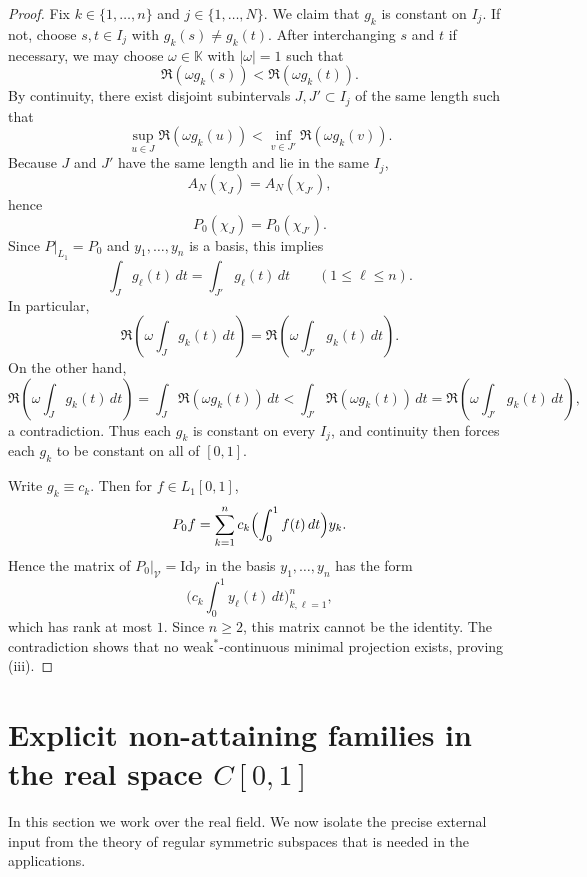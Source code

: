 \documentclass[11pt]{amsart}
\numberwithin{equation}{section}
\theoremstyle{definition}
\theoremstyle{remark}
\newcommand{\K}{\mathbb K}
\newcommand{\Id}{\mathrm{Id}}
\begin{document}
\begin{proof}
Fix $k\in\{1,\dots,n\}$ and $j\in\{1,\dots,N\}$. We claim that $g_k$ is constant on $I_j$. If not, choose $s,t\in I_j$ with $g_k(s)\neq g_k(t)$. After interchanging $s$ and $t$ if necessary, we may choose $\omega\in\K$ with $|\omega|=1$ such that
\[
\Re(\omega g_k(s)) < \Re(\omega g_k(t)).
\]
By continuity, there exist disjoint subintervals $J,J'\subset I_j$ of the same length such that
\[
\sup_{u\in J} \Re(\omega g_k(u)) < \inf_{v\in J'} \Re(\omega g_k(v)).
\]
Because $J$ and $J'$ have the same length and lie in the same $I_j$,
\[
A_N(\chi_J)=A_N(\chi_{J'}),
\]
hence
\[
P_0(\chi_J)=P_0(\chi_{J'}).
\]
Since $P|_{L_1}=P_0$ and $y_1,\dots,y_n$ is a basis, this implies
\[
\int_J g_\ell(t)\,dt = \int_{J'} g_\ell(t)\,dt
\qquad (1\leqslant \ell\leqslant n).
\]
In particular,
\[
\Re\left(\omega\int_J g_k(t)\,dt\right)
=
\Re\left(\omega\int_{J'} g_k(t)\,dt\right).
\]
On the other hand,
\[
\Re\left(\omega\int_J g_k(t)\,dt\right)
=
\int_J \Re(\omega g_k(t))\,dt
<
\int_{J'} \Re(\omega g_k(t))\,dt
=
\Re\left(\omega\int_{J'} g_k(t)\,dt\right),
\]
a contradiction. Thus each $g_k$ is constant on every $I_j$, and continuity then forces each $g_k$ to be constant on all of $[0,1]$.

Write $g_k\equiv c_k$. Then for $f\in L_1[0,1]$,
\[
P_0f = \sum_{k=1}^n c_k\Bigl(\int_0^1 f(t)\,dt\Bigr) y_k.
\]
Hence the matrix of $P_0|_{\mathscr V}=\Id_{\mathscr V}$ in the basis $y_1,\dots,y_n$ has the form
\[
\bigl(c_k\!\int_0^1 y_\ell(t)\,dt\bigr)_{k,\ell=1}^n,
\]
which has rank at most $1$. Since $n\geqslant 2$, this matrix cannot be the identity. The contradiction shows that no weak$^*$-continuous minimal projection exists, proving \textup{(iii)}.
\end{proof}


\section{Explicit non-attaining families in the real space \texorpdfstring{$C[0,1]$}{C[0,1]}}
\label{sec:examples}

In this section we work over the real field. We now isolate the precise external input from the theory of regular symmetric subspaces that is needed in the applications.
\end{document}
